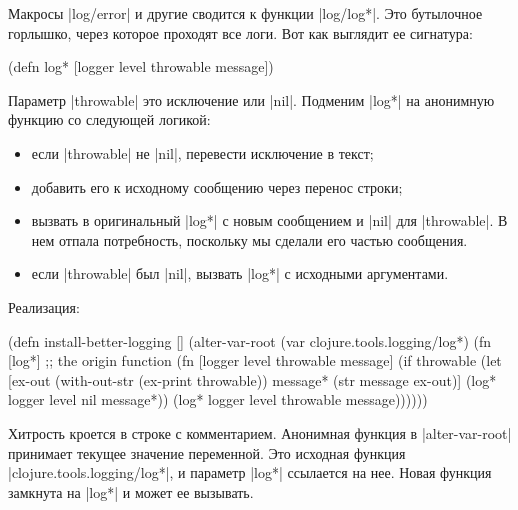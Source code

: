 Макросы \spverb|log/error| и другие сводится к функции \spverb|log/log*|. Это
бутылочное горлышко, через которое проходят все логи. Вот как выглядит ее
сигнатура:

\begin{english}
  \begin{clojure}
(defn log* [logger level throwable message])
  \end{clojure}
\end{english}

Параметр \spverb|throwable| это исключение или \spverb|nil|. Подменим
\spverb|log*| на анонимную функцию со следующей логикой:

\begin{itemize}

\item
  если \spverb|throwable| не \spverb|nil|, перевести исключение в текст;

\item
  добавить его к исходному сообщению через перенос строки;

\item
  вызвать в оригинальный \spverb|log*| с новым сообщением и \spverb|nil| для
  \spverb|throwable|. В нем отпала потребность, поскольку мы сделали его частью
  сообщения.

\item
  если \spverb|throwable| был \spverb|nil|, вызвать \spverb|log*| с исходными
  аргументами.

\end{itemize}

\noindent
Реализация:

\begin{english}
  \begin{clojure}
(defn install-better-logging []
  (alter-var-root
   (var clojure.tools.logging/log*)
   (fn [log*] ;; the origin function
     (fn [logger level throwable message]
       (if throwable
         (let [ex-out (with-out-str (ex-print throwable))
               message* (str message \newline ex-out)]
           (log* logger level nil message*))
         (log* logger level throwable message))))))
  \end{clojure}
\end{english}

Хитрость кроется в строке с комментарием. Анонимная функция в
\spverb|alter-var-root| принимает текущее значение переменной. Это исходная
функция \spverb|clojure.tools.logging/log*|, и параметр \spverb|log*| ссылается
на нее. Новая функция замкнута на \spverb|log*| и может ее вызывать.

